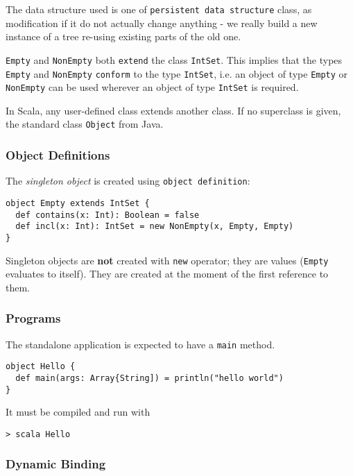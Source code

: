 \documentclass{scrartcl}
\newcommand{\term}[1]{\verb~#1~} %
\begin{document}
The data structure used is one of \term{persistent data structure} class, as
modification if it do not actually change anything - we really build a new
instance of a tree re-using existing parts of the old one.

\lstinline|Empty| and \lstinline|NonEmpty| both \term{extend} the class
\lstinline|IntSet|. This implies that the types \lstinline|Empty| and
\lstinline|NonEmpty| \term{conform} to the type \lstinline|IntSet|, i.e. an
object of type \lstinline|Empty| or \lstinline|NonEmpty| can be used wherever an
object of type \lstinline|IntSet| is required.

In Scala, any user-defined class extends another class. If no superclass is
given, the standard class \lstinline|Object| from Java.

\subsubsection{Object Definitions}
\label{sec:ObjectDefinitions}

The {\it singleton object} is created using \term{object definition}:
\begin{lstlisting}
object Empty extends IntSet {
  def contains(x: Int): Boolean = false
  def incl(x: Int): IntSet = new NonEmpty(x, Empty, Empty)
}
\end{lstlisting}

Singleton objects are {\bf not} created with \lstinline|new| operator; they are
values (\lstinline|Empty| evaluates to itself). They are created at the moment
of the first reference to them.

\subsubsection{Programs}
\label{sec:Programs}

The standalone application is expected to have a \lstinline|main| method.
\begin{lstlisting}
object Hello {
  def main(args: Array{String]) = println("hello world")
}
\end{lstlisting}
It must be compiled and run with
\begin{lstlisting}
> scala Hello
\end{lstlisting}

\subsubsection{Dynamic Binding}
\label{sec:DynamicBinding}
\end{document}
